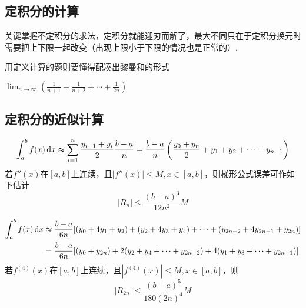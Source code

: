 \subsection{定积分的计算}
关键掌握不定积分的求法，定积分就能迎刃而解了，最大不同只在于定积分换元时需要把上下限一起改变（出现上限小于下限的情况也是正常的）.
\par 用定义计算的题则要懂得配凑出黎曼和的形式
\begin{exercise}
\label{limitrimsum}
$\displaystyle\lim_{n\to\infty}\left(\frac{1}{n+1}+\frac{1}{n+2}+\cdots+\frac{1}{2n}\right)$
\end{exercise}

\subsection{定积分的近似计算}
\begin{definition}[定积分梯形公式]
\[\int_a^bf(x)\,\mathrm{d} x\thickapprox\sum_{i=1}^n\frac{y_{i-1}+y_i}{2}\frac{b-a}{n}=\frac{b-a}{n}\left(\frac{y_0+y_n}{2}+y_1+y_2+\cdots+y_{n-1}\right)\]
若$f''(x)$在$[a,b]$上连续，且$|f''(x)|\leq M,x\in[a,b]$，则梯形公式误差可作如下估计
\[|R_n|\leq\frac{(b-a)^3}{12n^2}M\]
\end{definition}
\begin{definition}
\[\begin{aligned}
\int_a^bf(x)\,\mathrm{d} x &\thickapprox\frac{b-a}{6n}[(y_0+4y_1+y_2)+(y_2+4y_3+y_4)+\cdots+(y_{2n-2}+4y_{2n-1}+y_{2n})]\\
&=\frac{b-a}{6n}[(y_0+y_{2n})+2(y_2+y_4+\cdots+y_{2n-2})+4(y_1+y_3+\cdots+y_{2n-1})]\end{aligned}\]
若$f^{(4)}(x)$在$[a,b]$上连续，且$|f^{(4)}(x)|\leq M,x\in[a,b]$，则
\[|R_{2n}|\leq\frac{(b-a)^5}{180(2n)^4}M\]
\end{definition}

